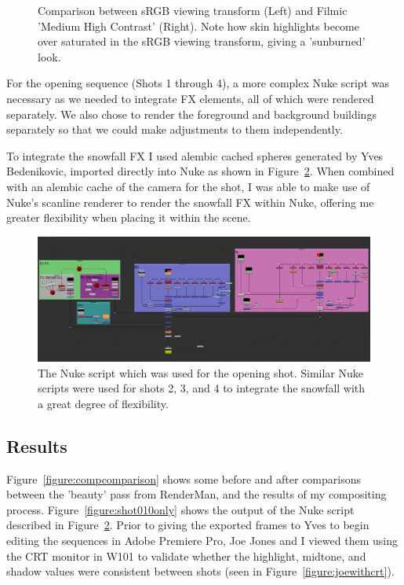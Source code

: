 \documentclass[11pt]{article}
\begin{document}
\begin{figure}[htbp]
\caption{\label{figure:filmic} Comparison between sRGB viewing transform (Left) and Filmic 'Medium High Contrast' (Right). Note how skin highlights become over saturated in the sRGB viewing transform, giving a 'sunburned' look.}
\end{figure}

For the opening sequence (Shots 1 through 4), a more complex Nuke script was necessary as we needed to integrate FX elements, all of which were rendered separately. We also chose to render the foreground and background buildings separately so that we could make adjustments to them independently.

To integrate the snowfall FX I used alembic cached spheres generated by Yves Bedenikovic, imported directly into Nuke as shown in Figure~\ref{figure:shot010comp}. When combined with an alembic cache of the camera for the shot, I was able to make use of Nuke's scanline renderer to render the snowfall FX within Nuke, offering me greater flexibility when placing it within the scene.

\begin{figure}[htbp]\centering
	\includegraphics[width=1.0\linewidth]{images/shot010comp.png}
	\caption{\label{figure:shot010comp} The Nuke script which was used for the opening shot. Similar Nuke scripts were used for shots 2, 3, and 4 to integrate the snowfall with a great degree of flexibility.}
\end{figure}

\subsection{Results}

Figure~\ref{figure:compcomparison} shows some before and after comparisons between the 'beauty' pass from RenderMan, and the results of my compositing process. Figure~\ref{figure:shot010only} shows the output of the Nuke script described in Figure~\ref{figure:shot010comp}. Prior to giving the exported frames to Yves to begin editing the sequences in Adobe Premiere Pro, Joe Jones and I viewed them using the CRT monitor in W101 to validate whether the highlight, midtone, and shadow values were consistent between shots (seen in Figure~\ref{figure:joewithcrt}).
\end{document}
